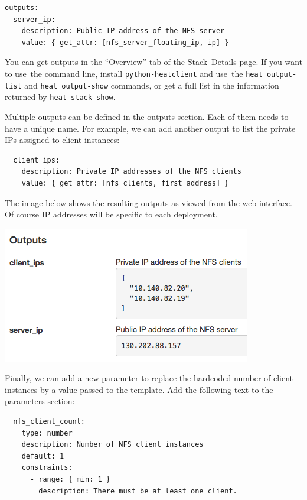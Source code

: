 \begin{footnotesize}
\begin{verbatim}
outputs:
  server_ip:
    description: Public IP address of the NFS server
    value: { get_attr: [nfs_server_floating_ip, ip] }
\end{verbatim}
\end{footnotesize}

You can get outputs in the ``Overview'' tab of the Stack~Details page.
If you want to use~the command line, install \texttt{python-heatclient}
and use~the \texttt{heat\ output-list} and \texttt{heat\ output-show}
commands, or get a full list in the information returned by
\texttt{heat\ stack-show}.

Multiple outputs can be defined in the outputs section. Each of them
needs to have a unique name. For example, we can add another output to
list the private IPs assigned to client instances:

\begin{footnotesize}
\begin{verbatim}
  client_ips:
    description: Private IP addresses of the NFS clients
    value: { get_attr: [nfs_clients, first_address] }
\end{verbatim}
\end{footnotesize}

The image below shows the resulting outputs as viewed from the web
interface. Of course IP addresses will be specific to each deployment.

\includegraphics[width=0.5\columnwidth]{images/chameleon/Outputs.png}

Finally, we can add a new parameter to replace the hardcoded number of
client instances by a value passed to the template. Add the following
text to the parameters section:

\begin{footnotesize}
\begin{verbatim}
  nfs_client_count:
    type: number
    description: Number of NFS client instances
    default: 1
    constraints:
      - range: { min: 1 }
        description: There must be at least one client.
\end{verbatim}
\end{footnotesize}

